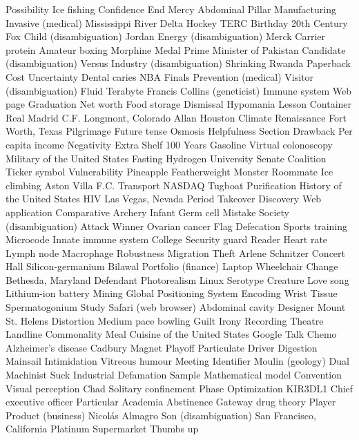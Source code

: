 Possibility  Ice fishing  Confidence  
End  Mercy  Abdominal  
Pillar  Manufacturing  Invasive (medical)  
Mississippi River Delta  Hockey  TERC  
Birthday  20th Century Fox  Child (disambiguation)  
Jordan  Energy (disambiguation)  Merck  
Carrier protein  Amateur boxing  Morphine  
Medal  Prime Minister of Pakistan  Candidate (disambiguation)  
Versus  Industry (disambiguation)  Shrinking  
Rwanda  Paperback  Cost  
Uncertainty  Dental caries  NBA Finals  
Prevention (medical)  Visitor (disambiguation)  Fluid  
Terabyte  Francis Collins (geneticist)  Immune system  
Web page  Graduation  Net worth  
Food storage  Dismissal  Hypomania  
Lesson  Container  Real Madrid C.F.  
Longmont, Colorado  Allan Houston  Climate  
Renaissance  Fort Worth, Texas  Pilgrimage  
Future tense  Osmosis  Helpfulness  
Section  Drawback  Per capita income  
Negativity  Extra  Shelf  
100 Years  Gasoline  Virtual colonoscopy  
Military of the United States  Fasting  Hydrogen  
University  Senate  Coalition  
Ticker symbol  Vulnerability  Pineapple  
Featherweight  Monster  Roommate  
Ice climbing  Aston Villa F.C.  Transport  
NASDAQ  Tugboat  Purification  
History of the United States  HIV  Las Vegas, Nevada  
Period  Takeover  Discovery  
Web application  Comparative  Archery  
Infant  Germ cell  Mistake  
Society (disambiguation)  Attack  Winner  
Ovarian cancer  Flag  Defecation  
Sports training  Microcode  Innate immune system  
College  Security guard  Reader  
Heart rate  Lymph node  Macrophage  
Robustness  Migration  Theft  
Arlene Schnitzer Concert Hall  Silicon-germanium  Bilawal  
Portfolio (finance)  Laptop  Wheelchair  
Change  Bethesda, Maryland  Defendant  
Photorealism  Linux  Serotype  
Creature  Love song  Lithium-ion battery  
Mining  Global Positioning System  Encoding  
Wrist  Tissue  Spermatogonium  
Study  Safari (web browser)  Abdominal cavity  
Designer  Mount St. Helens  Distortion  
Medium pace bowling  Guilt  Irony  
Recording  Theatre  Landline  
Commonality  Meal  Cuisine of the United States  
Google Talk  Chemo  Alzheimer's disease  
Cadbury  Magnet  Playoff  
Particulate  Driver  Digestion  
Mainsail  Intimidation  Vitreous humour  
Meeting  Identifier  Moulin (geology)  
Dual  Machinist  Suck  
Industrial  Defamation  Sample  
Mathematical model  Convention  Visual perception  
Chad  Solitary confinement  Phase  
Optimization  KIR3DL1  Chief executive officer  
Particular  Academia  Abstinence  
Gateway drug theory  Player  Product (business)  
Nicolás Almagro  Son (disambiguation)  San Francisco, California  
Platinum  Supermarket  Thumbs up  
